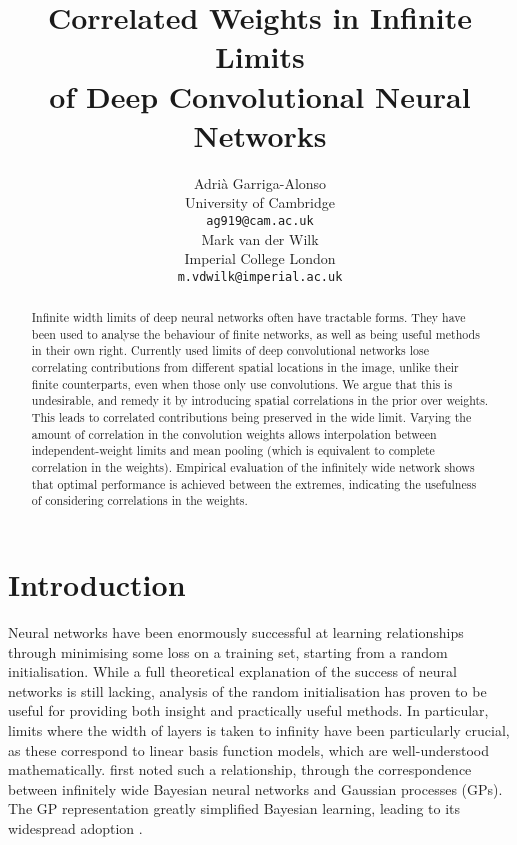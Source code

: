 \documentclass{article}
\title{Correlated Weights in Infinite Limits \\ of Deep Convolutional Neural Networks}
\author{%
  Adrià Garriga-Alonso \\
  University of Cambridge \\
  \texttt{ag919@cam.ac.uk} \\
   \And
   Mark van der Wilk \\
   Imperial College London \\
   \texttt{m.vdwilk@imperial.ac.uk} \\
}
\theoremstyle{definition}
\begin{document}
\maketitle

\begin{abstract}
Infinite width limits of deep neural networks often have tractable forms. They have been used to analyse the behaviour of finite networks, as well as being useful methods in their own right. Currently used limits of deep convolutional networks lose correlating contributions from different spatial locations in the image, unlike their finite counterparts, even when those only use convolutions. We argue that this is undesirable, and remedy it by introducing spatial correlations in the prior over weights. This leads to correlated contributions being preserved in the wide limit. Varying the amount of correlation in the convolution weights allows interpolation between independent-weight limits and mean pooling (which is equivalent to complete correlation in the weights). Empirical evaluation of the infinitely wide network shows that optimal performance is achieved between the extremes, indicating the usefulness of considering correlations in the weights.
\end{abstract}



\section{Introduction}
Neural networks have been enormously successful at learning relationships through minimising some loss on a training set, starting from a random initialisation. While a full theoretical explanation of the success of neural networks is still lacking, analysis of the random initialisation has proven to be useful for providing both insight and practically useful methods.
In particular, limits where the width of layers is taken to infinity have been particularly crucial, as these correspond to linear basis function models, which are well-understood mathematically.
\citet{neal1996bayesian} first noted such a relationship, through the correspondence between infinitely wide Bayesian neural networks and Gaussian processes (GPs). The GP representation greatly simplified Bayesian learning, leading to its widespread adoption \citep{williams1996gpr,gpml}.
\end{document}
